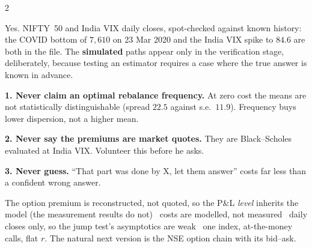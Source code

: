 \documentclass[12pt,a4paper]{extarticle}
\begin{document}
\begin{multicols}{2}
\begin{qb}
\scriptsize
Yes. NIFTY~50 and India VIX daily closes, spot-checked against known history: the COVID bottom
of $7{,}610$ on 23 Mar 2020 and the India VIX spike to $84.6$ are both in the file. The
\textbf{simulated} paths appear only in the verification stage, deliberately, because testing
an estimator requires a case where the true answer is known in advance.
\end{qb}

\begin{tb}
\scriptsize
\textbf{1. Never claim an optimal rebalance frequency.} At zero cost the means are not
statistically distinguishable (spread $22.5$ against s.e.\ $11.9$). Frequency buys lower
dispersion, not a higher mean.

\textbf{2. Never say the premiums are market quotes.} They are Black--Scholes evaluated at
India VIX. Volunteer this before he asks.

\textbf{3. Never guess.} ``That part was done by X, let them answer'' costs far less than a
confident wrong answer.
\end{tb}

\begin{kb}
\scriptsize
The option premium is reconstructed, not quoted, so the P\&L \emph{level} inherits the model
(the measurement results do not) \textbullet\ costs are modelled, not measured \textbullet\
daily closes only, so the jump test's asymptotics are weak \textbullet\ one index,
at-the-money calls, flat $r$. The natural next version is the NSE option chain with its
bid--ask.
\end{kb}

\end{multicols}
\end{document}

